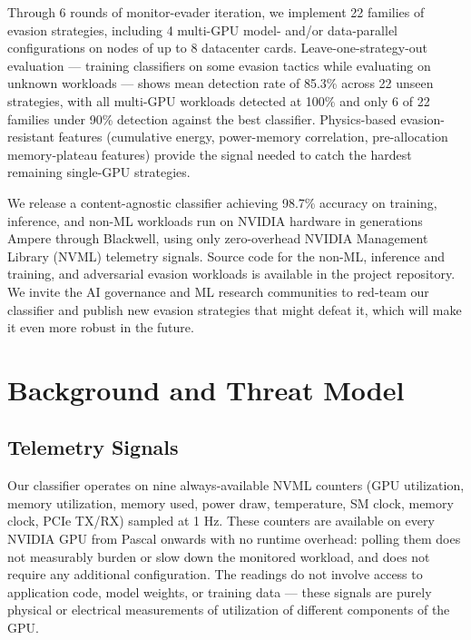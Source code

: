 Through 6 rounds of monitor-evader iteration, we implement 22 families of evasion strategies, including 4 multi-GPU model- and/or data-parallel configurations on nodes of up to 8 datacenter cards. Leave-one-strategy-out evaluation --- training classifiers on some evasion tactics while evaluating on unknown workloads --- shows mean detection rate of 85.3\% across 22 unseen strategies, with all multi-GPU workloads detected at 100\% and only 6 of 22 families under 90\% detection against the best classifier. Physics-based evasion-resistant features (cumulative energy, power-memory correlation, pre-allocation memory-plateau features) provide the signal needed to catch the hardest remaining single-GPU strategies.

We release a content-agnostic classifier achieving 98.7\% accuracy on training, inference, and non-ML workloads run on NVIDIA hardware in generations Ampere through Blackwell, using only zero-overhead NVIDIA Management Library (NVML) telemetry signals. Source code for the non-ML, inference and training, and adversarial evasion workloads is available in the project repository. We invite the AI governance and ML research communities to red-team our classifier and publish new evasion strategies that might defeat it, which will make it even more robust in the future.

\section{Background and Threat Model}

\subsection{Telemetry Signals}

Our classifier operates on nine always-available NVML counters (GPU utilization, memory utilization, memory used, power draw, temperature, SM clock, memory clock, PCIe TX/RX) sampled at 1 Hz. These counters are available on every NVIDIA GPU from Pascal onwards with no runtime overhead: polling them does not measurably burden or slow down the monitored workload, and does not require any additional configuration. The readings do not involve access to application code, model weights, or training data --- these signals are purely physical or electrical measurements of utilization of different components of the GPU.

